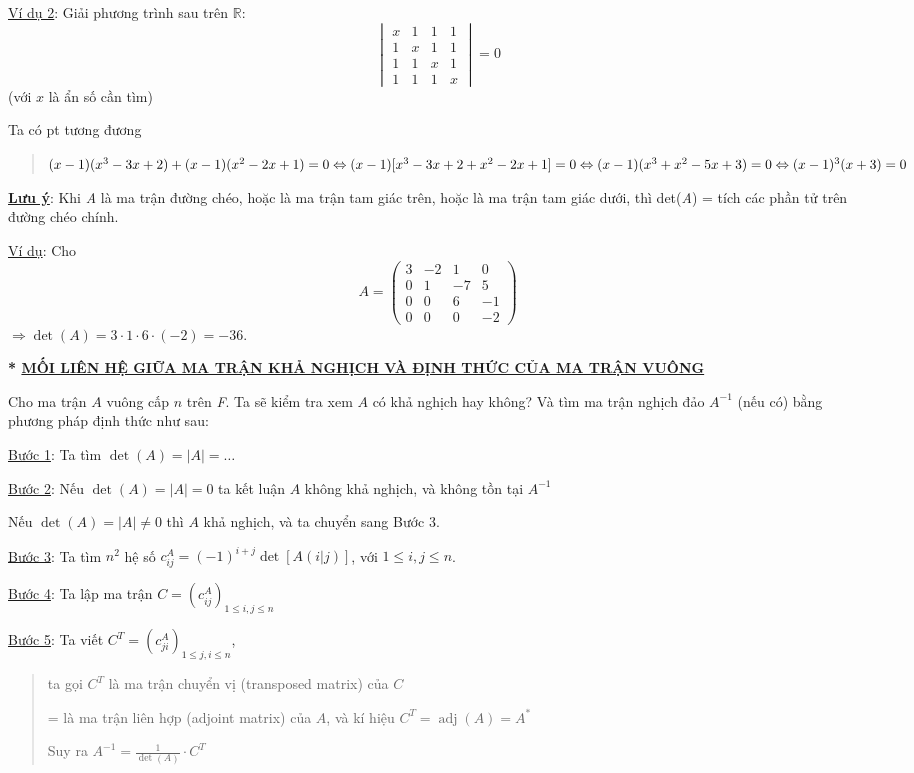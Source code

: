 \documentclass[
]{article}
\let\ul\uline
\begin{document}
\ul{Ví dụ 2}: Giải phương trình sau trên
$\mathbb{R}$:
$$\begin{vmatrix} x & 1 & 1 & 1 \\ 1 & x & 1 & 1 \\ 1 & 1 & x & 1 \\ 1 & 1 & 1 & x \end{vmatrix} = 0$$ (với
$x$ là ẩn số cần
tìm)

Ta có pt tương đương

\begin{quote}
$(x-1)(x^3-3x+2) + (x-1)(x^2-2x+1) = 0 \\ \Leftrightarrow (x-1)[x^3-3x+2+x^2-2x+1] = 0 \\ \Leftrightarrow (x-1)(x^3+x^2-5x+3) = 0 \\ \Leftrightarrow (x-1)^3(x+3) = 0$
\end{quote}

\textbf{\ul{Lưu ý}}: Khi \emph{A} là ma trận đường chéo, hoặc là ma trận
tam giác trên, hoặc là ma trận tam giác dưới, thì det(\emph{A}) = tích
các phần tử trên đường chéo chính.

\ul{Ví dụ}: Cho
$$A = \begin{pmatrix} 3 & -2 & 1 & 0 \\ 0 & 1 & -7 & 5 \\ 0 & 0 & 6 & -1 \\ 0 & 0 & 0 & -2 \end{pmatrix}$$$\Rightarrow \det(A) = 3 \cdot 1 \cdot 6 \cdot (-2) = -36$.

\textbf{* \ul{MỐI LIÊN HỆ GIỮA MA TRẬN KHẢ NGHỊCH VÀ ĐỊNH THỨC CỦA MA
TRẬN VUÔNG}}

Cho ma trận $A$
vuông cấp $n$ trên
\emph{F}. Ta sẽ kiểm tra xem
$A$ có khả nghịch
hay không? Và tìm ma trận nghịch đảo
$A^{-1}$ (nếu có) bằng
phương pháp định thức như sau:

\ul{Bước 1}: Ta tìm
$\det(A) = |A| = \dots$

\ul{Bước 2}: Nếu
$\det(A) = |A| = 0$ ta kết luận
$A$ không khả
nghịch, và không tồn tại
$A^{-1}$

Nếu $\det(A) = |A| \neq 0$ thì
$A$ khả nghịch, và
ta chuyển sang Bước 3.

\ul{Bước 3}: Ta tìm
$n^2$ hệ số
$c_{ij}^A = (-1)^{i+j} \det[A(i|j)]$, với
$1 \le i, j \le n$.

\ul{Bước 4}: Ta lập ma trận
$C = (c_{ij}^A)_{1 \le i, j \le n}$

\ul{Bước 5}: Ta viết
$C^T = (c_{ji}^A)_{1 \le j, i \le n}$,

\begin{quote}
ta gọi $C^T$ là ma
trận chuyển vị (transposed matrix) của
$C$

= là ma trận liên hợp (adjoint matrix) của
$A$, và kí hiệu
$C^T = \operatorname{adj}(A) = A^*$

Suy ra $A^{-1} = \frac{1}{\det(A)} \cdot C^T$
\end{quote}
\end{document}
